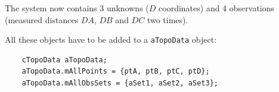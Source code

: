 The system now contains 3 unknowns ($D$ coordinates) and 4 observations
(measured distances $DA$, $DB$ and $DC$ two times).

All these objects have to be added to a \texttt{aTopoData} object:

\begin{lstlisting}
    cTopoData aTopoData;
    aTopoData.mAllPoints = {ptA, ptB, ptC, ptD};
    aTopoData.mAllObsSets = {aSet1, aSet2, aSet3};
\end{lstlisting}

